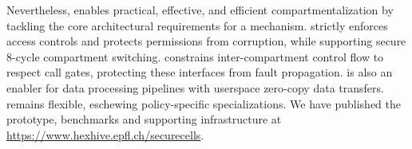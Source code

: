 Nevertheless, \seccells enables practical, effective, and efficient
compartmentalization by tackling 
the core architectural requirements for a mechanism.
\seccells strictly enforces access controls and protects permissions
from corruption, while supporting secure 8-cycle compartment switching.
\seccells constrains inter-compartment control flow to respect
call gates, protecting these interfaces from fault propagation.
\seccells is also an enabler for data processing pipelines
with userspace zero-copy data transfers.
\seccells remains flexible, eschewing policy-specific specializations.
We have published the \seccells prototype, benchmarks
and supporting infrastructure
at \url{https://www.hexhive.epfl.ch/securecells}.
